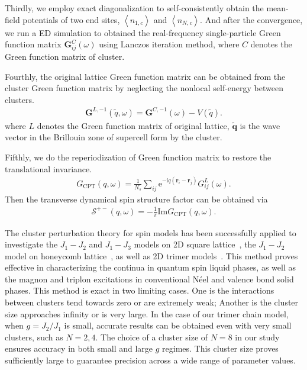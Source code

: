 \documentclass[aps,prx,showpacs,floatfix,twocolumn,superscriptaddress,nofootinbib,longbibliography]{revtex4-2}
\begin{document}
Thirdly, we employ exact diagonalization to self-consistently obtain the mean-field potentials of two end sites, $\left\langle n_{1,c}\right\rangle$ and $\left\langle n_{N,c}\right\rangle$. And after the convergence, we run a ED simulation to obtained the real-frequency single-particle Green function matrix $\mathbf{G}_{ij}^{C}(\omega)$ using Lanczos iteration method, where $C$ denotes the Green function matrix of cluster.

Fourthly, the original lattice Green function matrix can be obtained from the cluster Green function matrix by neglecting the nonlocal self-energy between clusters.
\begin{eqnarray}
	\mathbf{G}^{L,-1}(\tilde{q},\omega)=\mathbf{G}^{C,-1}(\omega)-V(\tilde{q}).
\end{eqnarray}
where $L$ denotes the Green function matrix of original lattice, $\tilde{\mathbf{q}}$ is the wave vector in the Brillouin zone of supercell form by the cluster.

Fifthly, we do the reperiodization of Green function matrix to restore the translational invariance. 
\begin{eqnarray}
	G_\mathrm{CPT}(q, \omega)=\frac{1}{N_s}\sum_{ij} \mathrm{e}^{-\mathrm{i} q(\mathbf{r}_i-\mathbf{r}_j)}G_{ij}^L(\omega).
\end{eqnarray}
Then the transverse dynamical spin structure factor can be obtained via
\begin{eqnarray}
	\mathcal{S}^{+-}(q, \omega)=-\frac{1}{\pi} \mathrm{Im} G_\mathrm{CPT}(q, \omega).
\end{eqnarray}

The cluster perturbation theory for spin models has been successfully applied to investigate the $J_1-J_2$ and $J_1-J_3$ models on 2D square lattice~\cite{PhysRevB.98.134410,PhysRevB.106.125129}, the $J_1-J_2$ model on honeycomb lattice~\cite{PhysRevB.105.174403}, as well as 2D trimer models~\cite{chang2023magnon}. This method proves effective in characterizing the continua in quantum spin liquid phases, as well as the magnon and triplon excitations in conventional N\'{e}el and valence bond solid phases. This method is exact in two limiting cases. One is the interactions between clusters tend towards zero or are extremely weak; Another is the cluster size approaches infinity or is very large. In the case of our trimer chain model, when $g=J_2/J_1$ is small, accurate results can be obtained even with very small clusters, such as $N=2,4$. The choice of a cluster size of $N=8$ in our study ensures accuracy in both small and large $g$ regimes. This cluster size proves sufficiently large to guarantee precision across a wide range of parameter values.
\end{document}
